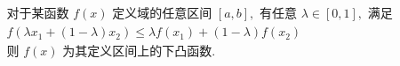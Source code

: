 \documentclass[preview]{standalone}
\begin{document}
\begin{align*}
& \text{对于某函数 } f(x) \text{ 定义域的任意区间 } [a, b], \text{ 有任意 } \lambda \in [0, 1], \text{ 满足} \\ & f(\lambda x_1 + (1 - \lambda) x_2) \leq \lambda f(x_1) + (1 - \lambda) f(x_2) \\ & \text{则 } f(x) \text{ 为其定义区间上的下凸函数.}
\end{align*}
\end{document}
